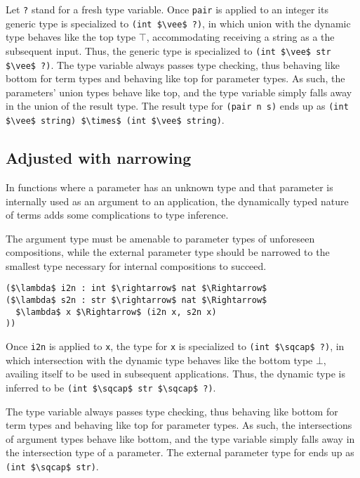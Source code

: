 \documentclass[sigplan]{acmart}
\theoremstyle{definition}
\begin{document}
Let \lstinline{?} stand for a fresh type variable.
Once \lstinline{pair} is applied to an integer its generic type is specialized to 
\lstinline{(int $\vee$ ?)}, 
in which union with the dynamic type behaves like the top type $\top$, 
accommodating receiving a string as a the subsequent input.
Thus, the generic type is specialized to 
\newline
\lstinline{(int $\vee$ str $\vee$ ?)}.
The type variable always passes type checking, 
thus behaving like bottom for term types
and behaving like top for parameter types.
As such, the parameters' union types behave like top,
and the type variable simply falls away in the union of the result type. 
The result type for \lstinline{(pair n s)} ends up as 
\newline
\lstinline{(int $\vee$ string) $\times$ (int $\vee$ string)}. 

\subsection{Adjusted with narrowing}

In functions where a parameter has an unknown type and that parameter is 
internally used as an argument to an application, the dynamically typed 
nature of terms adds some complications to type inference.

The argument type must be amenable to parameter types 
of unforeseen compositions,
while the external parameter type should be narrowed 
to the smallest type necessary for internal compositions to
succeed.

\begin{lstlisting}
($\lambda$ i2n : int $\rightarrow$ nat $\Rightarrow$ 
($\lambda$ s2n : str $\rightarrow$ nat $\Rightarrow$ 
  $\lambda$ x $\Rightarrow$ (i2n x, s2n x)
))

\end{lstlisting}

Once \lstinline{i2n} is applied to \lstinline{x}, 
the type for \lstinline{x} is specialized to \lstinline{(int $\sqcap$ ?)}, 
in which intersection with the dynamic type behaves like the bottom type $\bot$,
availing itself to be used in subsequent applications. 
Thus, the dynamic type is inferred to be \lstinline{(int $\sqcap$ str $\sqcap$ ?)}.

The type variable always passes type checking, 
thus behaving like bottom for term types
and behaving like top for parameter types.
As such, the intersections of argument types behave like bottom,
and the type variable simply falls away in the intersection type of a parameter.
The external parameter type for ends up as \lstinline{(int $\sqcap$ str)}. 
\end{document}
